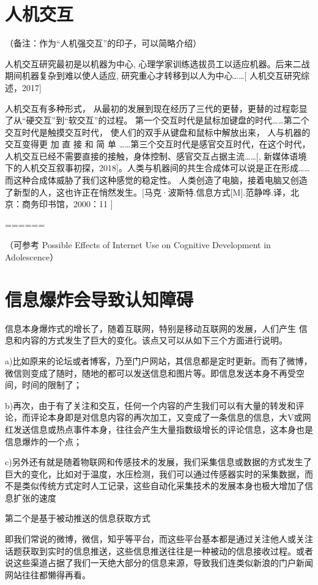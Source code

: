 \color{blue}

\section{人机交互}
（备注：作为“人机强交互”的印子，可以简略介绍）

人机交互研究最初是以机器为中心, 心理学家训练选拔员工以适应机器。后来二战期间机器复杂到难以使人适应, 研究重心才转移到以人为中心……[\cite{} 人机交互研究综述，2017]

人机交互有多种形式， 从最初的发展到现在经历了三代的更替，更替的过程彰显了从“硬交互”到“软交互”的过程。 第一个交互时代是鼠标加键盘的时代……第二个交互时代是触摸交互时代， 使人们的双手从键盘和鼠标中解放出来， 人与机器的交互变得更 加 直 接 和 简 单 ……第三个交互时代是感官交互时代，在这个时代，人机交互已经不需要直接的接触，身体控制、感官交互占据主流……[\cite{}, 新媒体语境下的人机交互叙事初探，2018]。人类与机器间的共生合成体可以说是正在形成……而这种合成体威胁了我们这种感觉的稳定性。 人类创造了电脑，接着电脑又创造了新型的人，这也许正在悄然发生。[\cite{}马克·波斯特.信息方式[M].范静哗.译，北京：商务印书馆，2000：11 ]


======

（可参考 Possible Effects of Internet Use on Cognitive Development in Adolescence\cite{Mills2016}）
\section*{信息爆炸会导致认知障碍}
信息本身爆炸式的增长了，随着互联网，特别是移动互联网的发展，人们产生
信息和内容的方式发生了巨大的变化。该点又可以从如下三个方面进行说明。

a)比如原来的论坛或者博客，乃至门户网站，其信息都是定时更新。而有了微博，微信则变成了随时，随地的都可以发送信息和图片等。即信息发送本身不再受空间，时间的限制了；

b)再次，由于有了关注和交互，任何一个内容的产生我们可以有大量的转发和评论，而评论本身即是对信息内容的再次加工，又变成了一条信息的信息，大V或网红发送信息或热点事件本身，往往会产生大量指数级增长的评论信息，这本身也是信息爆炸的一个点；

c)另外还有就是随着物联网和传感技术的发展，我们采集信息或数据的方式发生了巨大的变化，比如对于温度，水压检测，我们可以通过传感器实时的采集数据，而不是类似传统方式定时人工记录，这些自动化采集技术的发展本身也极大增加了信息扩张的速度


第二个是基于被动推送的信息获取方式

即我们常说的微博，微信，知乎等平台，而这些平台基本都是通过关注他人或关注话题获取到实时的信息推送，这些信息推送往往是一种被动的信息接收过程。或者说这些渠道占据了我们一天绝大部分的信息来源，导致我们连类似新浪的门户新闻网站往往都懒得再看。

